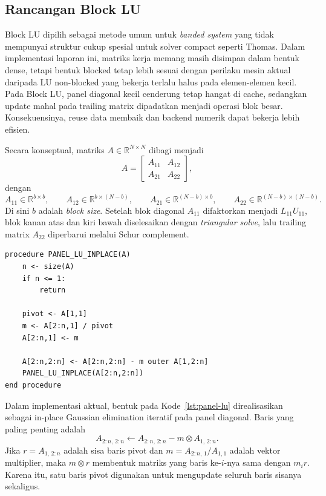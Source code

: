 \documentclass[12pt,a4paper]{article}
\begin{document}
\subsection{Rancangan Block LU}
Block LU dipilih sebagai metode umum untuk \emph{banded system} yang tidak mempunyai struktur cukup spesial untuk solver compact seperti Thomas. Dalam implementasi laporan ini, matriks kerja memang masih disimpan dalam bentuk dense, tetapi bentuk blocked tetap lebih sesuai dengan perilaku mesin aktual daripada LU non-blocked yang bekerja terlalu halus pada elemen-elemen kecil. Pada Block LU, panel diagonal kecil cenderung tetap hangat di cache, sedangkan update mahal pada trailing matrix dipadatkan menjadi operasi blok besar. Konsekuensinya, reuse data membaik dan backend numerik dapat bekerja lebih efisien.

Secara konseptual, matriks $A\in\mathbb{R}^{N\times N}$ dibagi menjadi
\[
A =
\begin{bmatrix}
A_{11} & A_{12} \\
A_{21} & A_{22}
\end{bmatrix},
\]
dengan
\[
A_{11}\in\mathbb{R}^{b\times b}, \qquad
A_{12}\in\mathbb{R}^{b\times (N-b)}, \qquad
A_{21}\in\mathbb{R}^{(N-b)\times b}, \qquad
A_{22}\in\mathbb{R}^{(N-b)\times (N-b)}.
\]
Di sini $b$ adalah \emph{block size}. Setelah blok diagonal $A_{11}$ difaktorkan menjadi $L_{11}U_{11}$, blok kanan atas dan kiri bawah diselesaikan dengan \emph{triangular solve}, lalu trailing matrix $A_{22}$ diperbarui melalui Schur complement.

\begin{lstlisting}[style=pseudo,caption={Pseudocode panel LU in-place pada blok diagonal kecil.},label={lst:panel-lu}]
procedure PANEL_LU_INPLACE(A)
    n <- size(A)
    if n <= 1:
        return

    pivot <- A[1,1]
    m <- A[2:n,1] / pivot
    A[2:n,1] <- m

    A[2:n,2:n] <- A[2:n,2:n] - m outer A[1,2:n]
    PANEL_LU_INPLACE(A[2:n,2:n])
end procedure
\end{lstlisting}

Dalam implementasi aktual, bentuk pada Kode~\ref{lst:panel-lu} direalisasikan sebagai in-place Gaussian elimination iteratif pada panel diagonal. Baris yang paling penting adalah
\[
A_{2:n,\,2:n} \leftarrow A_{2:n,\,2:n} - m \otimes A_{1,\,2:n}.
\]
Jika $r=A_{1,\,2:n}$ adalah sisa baris pivot dan $m=A_{2:n,\,1}/A_{1,1}$ adalah vektor multiplier, maka $m\otimes r$ membentuk matriks yang baris ke-$i$-nya sama dengan $m_i r$. Karena itu, satu baris pivot digunakan untuk mengupdate seluruh baris sisanya sekaligus.
\end{document}
